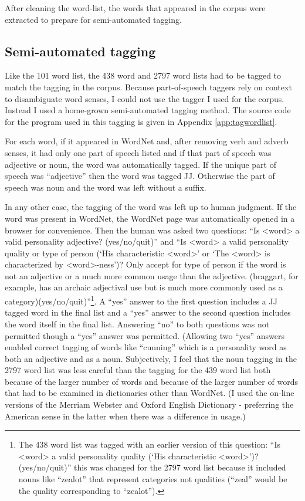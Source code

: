 After cleaning the word-list, the words that appeared in the corpus were 
extracted to prepare for semi-automated tagging.

\subsection{Semi-automated tagging}

Like the 101 word list, the 438 word and 2797 word lists had to be tagged to 
match the tagging in the corpus. Because part-of-speech taggers rely on context 
to disambiguate word senses, I could not use the tagger I used for the 
corpus. Instead I used a home-grown semi-automated tagging method. The source 
code for the program used in this tagging is given in 
Appendix \ref{app:tagwordlist}. 

For each word, if it appeared in WordNet \citep{PrincetonUniversity2010} and, 
after removing verb and adverb senses, it had only one part of speech listed and 
if that part of speech was adjective or noun, the word was automatically tagged. 
If the unique part of speech was ``adjective'' then the word was tagged JJ. 
Otherwise the part of speech was noun and the word was left without a suffix.

In any other case, the tagging of the word was left up to human judgment. If the
word was present in WordNet, the WordNet page was automatically opened in a 
browser for convenience. Then the human was asked two questions:
``Is <word> a valid personality adjective? (yes/no/quit)'' and ``Is <word> a 
valid personality quality or type of person (`His characteristic <word>' or 
`The <word> is characterized by <word>-ness')? Only accept for type of person 
if the word is not an adjective or a much more common usage than the adjective. 
(braggart, for example, has an archaic adjectival use but is much more commonly 
used as a category)(yes/no/quit)''\footnote{The 438 word list was tagged with an
earlier version of this question: ``Is <word> a valid personality quality 
(`His characteristic <word>')? (yes/no/quit)'' this was changed for the 2797 
word list because it included nouns like ``zealot'' that represent categories
not qualities (``zeal'' would be the quality corresponding to ``zealot'').}. A 
``yes'' answer to the first question includes a JJ tagged word in the final list
and a ``yes'' answer to the second question includes the word itself in the
final list. Answering ``no'' to both questions was not permitted though a 
``yes'' answer was permitted. (Allowing two ``yes'' answers enabled correct 
tagging of words like ``cunning'' which is a personality word as both an 
adjective and as a noun. Subjectively, I feel that the noun tagging in the 2797
word list was less careful than the tagging for the 439 word list both because
of the larger number of words and because of the larger number of words that
had to be examined in dictionaries other than WordNet. (I used the on-line
versions of the Merriam Webster and Oxford English Dictionary - preferring the
American sense in the latter when there was a difference in usage.)

